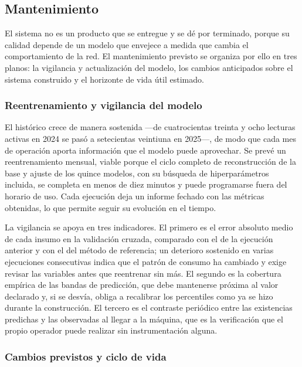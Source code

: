 \subsection{Mantenimiento}\label{mantenimiento}

El sistema no es un producto que se entregue y se dé por terminado, porque su calidad depende de un modelo que envejece a medida que cambia el comportamiento de la red. El mantenimiento previsto se organiza por ello en tres planos: la vigilancia y actualización del modelo, los cambios anticipados sobre el sistema construido y el horizonte de vida útil estimado.

\subsubsection{Reentrenamiento y vigilancia del modelo}\label{reentrenamiento-y-vigilancia-del-modelo}

El histórico crece de manera sostenida —de cuatrocientas treinta y ocho lecturas activas en 2024 se pasó a setecientas veintiuna en 2025—, de modo que cada mes de operación aporta información que el modelo puede aprovechar. Se prevé un reentrenamiento mensual, viable porque el ciclo completo de reconstrucción de la base y ajuste de los quince modelos, con su búsqueda de hiperparámetros incluida, se completa en menos de diez minutos y puede programarse fuera del horario de uso. Cada ejecución deja un informe fechado con las métricas obtenidas, lo que permite seguir su evolución en el tiempo.

La vigilancia se apoya en tres indicadores. El primero es el error absoluto medio de cada insumo en la validación cruzada, comparado con el de la ejecución anterior y con el del método de referencia; un deterioro sostenido en varias ejecuciones consecutivas indica que el patrón de consumo ha cambiado y exige revisar las variables antes que reentrenar sin más. El segundo es la cobertura empírica de las bandas de predicción, que debe mantenerse próxima al valor declarado y, si se desvía, obliga a recalibrar los percentiles como ya se hizo durante la construcción. El tercero es el contraste periódico entre las existencias predichas y las observadas al llegar a la máquina, que es la verificación que el propio operador puede realizar sin instrumentación alguna.

\subsubsection{Cambios previstos y ciclo de vida}\label{cambios-previstos-y-ciclo-de-vida}

